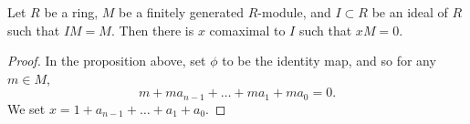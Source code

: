 \documentclass{ximera}
\begin{document}
\begin{corollary}
  Let $R$ be a ring, $M$ be a finitely generated $R$-module, and
  $I\subset R$ be an ideal of $R$ such that $IM = M$. Then there is
  $x$ comaximal to $I$ such that $xM = 0$.
  \begin{proof}
    In the proposition above, set $\phi$ to be the identity map, and
    so for any $m\in M$,
    \[
    m + m a_{n-1} + \dots + m a_1 + m a_0 = 0.
    \]
    We set $x = 1 + a_{n-1} + \dots + a_1 + a_0$.
  \end{proof}
\end{corollary}





\end{document}
